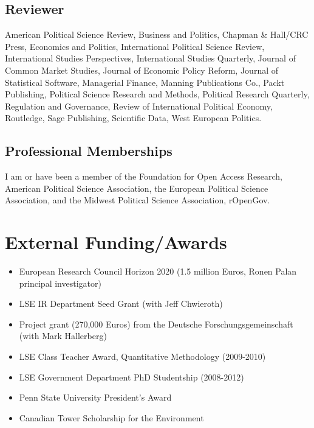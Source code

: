 \documentclass[a4paper]{article}
\begin{document}
\subsection*{Reviewer}

American Political Science Review, Business and Politics, Chapman \& Hall/CRC Press, Economics and Politics,
International Political Science Review, International Studies Perspectives,
International Studies Quarterly,
Journal of Common Market Studies, Journal of Economic Policy Reform, Journal of Statistical Software,
Managerial Finance, Manning Publications Co.,
Packt Publishing, Political Science Research and Methods, Political Research
Quarterly, Regulation and Governance, Review of International Political Economy,
Routledge, Sage Publishing, Scientific Data, West European Politics.

\subsection*{Professional Memberships}

I am or have been a member of the Foundation for Open Access Research, American Political Science Association, the European Political Science Association, and the Midwest Political Science Association, rOpenGov.

\section*{External Funding/Awards}

\begin{itemize}

    \item European Research Council Horizon 2020 (1.5 million Euros, Ronen Palan principal investigator)
    \item LSE IR Department Seed Grant (with Jeff Chwieroth)
    \item Project grant (270,000 Euros) from the Deutsche Forschungsgemeinschaft (with Mark Hallerberg)
    \item LSE Class Teacher Award, Quantitative Methodology (2009-2010)
    \item LSE Government Department PhD Studentship (2008-2012)
    \item Penn State University President's Award
    \item Canadian Tower Scholarship for the Environment

\end{itemize}
\end{document}
